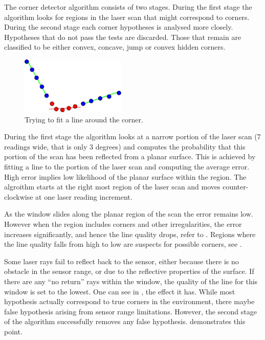 The corner detector algorithm consists of two stages. During the first
stage the algorithm looks for regions in the laser scan that might
correspond to corners. During the second stage each corner hypotheses
is analysed more closely. Hypotheses that do not pass the tests are
discarded. Those that remain are classified to be either convex,
concave, jump or convex hidden corners.

\begin{figure}[htbp]
  \centering
  \includegraphics[width=5cm]{Pics/fig_corner_example}
  \caption{Trying to fit a line around the corner.}
  \label{fig:corner_example}
\end{figure}

During the first stage the algorithm looks at a narrow portion of the
laser scan (7 readings wide, that is only 3 degrees) and computes the
probability that this portion of the scan has been reflected from a
planar surface. This is achieved by fitting a line to the portion of
the laser scan and computing the average error. High error implies low
likelihood of the planar surface within the region. The algroithm starts
at the right most region of the laser scan and moves counter-clockwise
at one laser reading increment.

As the window slides along the planar region of the scan the error
remains low. However when the region includes corners and other
irregularities, the error increases significantly, and hence the line
quality drops, refer to . Regions where
the line quality falls from high to low are suspects for possible
corners, see .

Some laser rays fail to reflect back to the sensor, either because
there is no obstacle in the sensor range, or due to the reflective
properties of the surface. If there are any ``no return'' rays within
the window, the quality of the line for this window is set to the
lowest. One can see in , the
effect it has. While most hypothesis actually correspond to true
corners in the environment, there maybe false hypothesis arising from
sensor range limitations. However, the second stage of the algorithm
successfully removes any false hypothesis.
 demonstrates this point.

